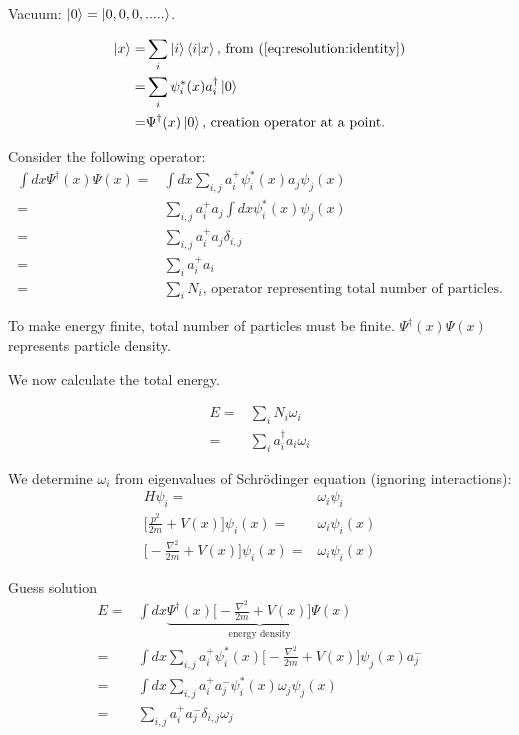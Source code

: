\documentclass[]{article}
\begin{document}
Vacuum: $\ket{0} = \ket{0,0,0,.....}$.

\begin{align*}
\ket{x}=&\sum_{i}\ket{i}\braket{i|x}\text{, from (\ref{eq:resolution:identity})}\\
=& \sum_i \psi^*_i(x)a^\dagger_i\ket{0}\\
=& \Psi^\dagger(x) \ket{0}\text{, creation operator at a point.}
\end{align*} 

Consider the following operator:
\begin{align*}
\int dx \Psi^\dagger(x) \Psi(x)=&\int dx \sum_{i,j}a^+_i\psi_i^*(x) a_j\psi_j(x)\\
=&\sum_{i,j} a^+_i a_j \int dx \psi_i^*(x) \psi_j(x)\\
=&\sum_{i,j} a^+_i a_j \delta_{i,j}\\
=&\sum_i a^+_i a_i\\
=&\sum_i N_i\text{, operator representing total number of particles.}
\end{align*}

To make energy finite, total number of particles must be finite. $\Psi^\dagger(x) \Psi(x)$ represents particle density.

We now calculate the total energy.

\begin{align*}
E =& \sum_{i} N_i \omega_i\\
=& \sum_{i} a^\dagger_i a_i \omega_i
\end{align*}

We determine $\omega_i$ from eigenvalues of Schr\"odinger equation (ignoring interactions):
\begin{align*}
H \psi_i =& \omega_i \psi_i\\
\big[\frac{p^2}{2m} + V(x)\big]\psi_i(x)=& \omega_i \psi_i(x)\\
\big[-\frac{\nabla^2}{2m} + V(x)\big]\psi_i(x)=& \omega_i \psi_i(x)
\end{align*}

Guess solution
\begin{align*}
E=&\int dx \underbrace{\Psi^\dagger(x) \big[-\frac{\nabla^2}{2m} + V(x)\big] \Psi(x)}_\text{energy density} \\
=& \int dx \sum_{i,j}a^+_i\psi_i^*(x)\big[-\frac{\nabla^2}{2m} + V(x)\big]\psi_j(x)a^-_j\\
=& \int dx \sum_{i,j} a^+_i a^-_j \psi_i^*(x) \omega_j \psi_j(x)\\
=&  \sum_{i,j} a^+_i a^-_j \delta_{i,j} \omega_j
\end{align*}
\end{document}
